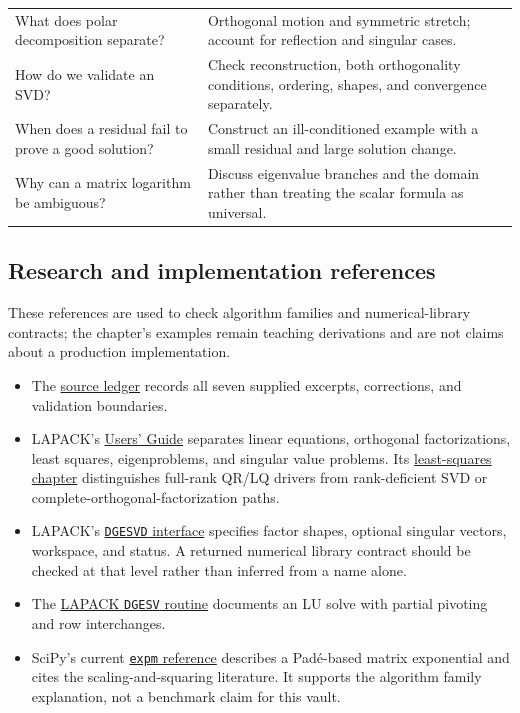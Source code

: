 {\begin{longtable}[]{@{}
  >{\raggedright\arraybackslash}p{}
  >{\raggedright\arraybackslash}p{}@{}}
What does polar decomposition separate? & Orthogonal motion and symmetric stretch; account for reflection and singular cases. \\
How do we validate an SVD? & Check reconstruction, both orthogonality conditions, ordering, shapes, and convergence separately. \\
When does a residual fail to prove a good solution? & Construct an ill-conditioned example with a small residual and large solution change. \\
Why can a matrix logarithm be ambiguous? & Discuss eigenvalue branches and the domain rather than treating the scalar formula as universal. \\
\end{longtable}
}

\subsection{Research and implementation references}\label{02-foundations-ii-ch039-research-and-implementation-references}

These references are used to check algorithm families and numerical-library contracts; the chapter's examples remain teaching derivations and are not claims about a production implementation.

\begin{itemize}
\tightlist
\item
  The \hyperref[appendix-a103e7846d21-phase-8---source-analysis-and-verification]{source ledger} records all seven supplied excerpts, corrections, and validation boundaries.
\item
  LAPACK's \href{https://netlib.org/lapack/lug/index.html}{Users' Guide} separates linear equations, orthogonal factorizations, least squares, eigenproblems, and singular value problems. Its \href{https://www.netlib.org/lapack/lug/node27.html}{least-squares chapter} distinguishes full-rank QR/LQ drivers from rank-deficient SVD or complete-orthogonal-factorization paths.
\item
  LAPACK's \href{https://netlib.org/lapack/explore-html/d1/d7f/group__gesvd_gac6bd5d4e645049e49bb70691180abf07.html}{\texttt{DGESVD} interface} specifies factor shapes, optional singular vectors, workspace, and status. A returned numerical library contract should be checked at that level rather than inferred from a name alone.
\item
  The \href{https://netlib.org/lapack/explore-html/d8/da6/group__gesv_ga831ce6a40e7fd16295752d18aed2d541.html}{LAPACK \texttt{DGESV} routine} documents an LU solve with partial pivoting and row interchanges.
\item
  SciPy's current \href{https://docs.scipy.org/doc/scipy/reference/generated/scipy.sparse.linalg.expm.html}{\texttt{expm} reference} describes a Padé-based matrix exponential and cites the scaling-and-squaring literature. It supports the algorithm family explanation, not a benchmark claim for this vault.
\end{itemize}

